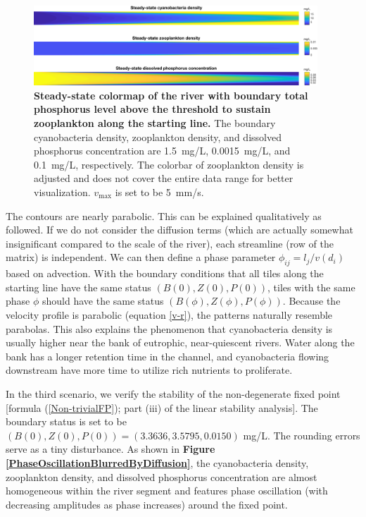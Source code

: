 \documentclass{article}
\begin{document}
\begin{figure}[H]
    \centering
    \includegraphics[width=0.95\textwidth]{ZooplanktonIncrease.pdf}
    \caption{\textbf{Steady-state colormap of the river with boundary total phosphorus level above the threshold to sustain zooplankton along the starting line.} The boundary cyanobacteria density, zooplankton density, and dissolved phosphorus concentration are \SI{1.5}{mg/L}, \SI{0.0015}{mg/L}, and \SI{0.1}{mg/L}, respectively. The colorbar of zooplankton density is adjusted and does not cover the entire data range for better visualization. $v_{\max}$ is set to be \SI{5}{mm/s}.}
    \label{ZIncrease}
\end{figure}

The contours are nearly parabolic. This can be explained qualitatively as followed. If we do not consider the diffusion terms (which are actually somewhat insignificant compared to the scale of the river), each streamline (row of the matrix) is independent. We can then define a phase parameter $\phi_{ij} = l_j / v(d_i)$ based on advection. With the boundary conditions that all tiles along the starting line have the same status $(B(0), Z(0), P(0))$, tiles with the same phase $\phi$ should have the same status $(B(\phi), Z(\phi), P(\phi))$. Because the velocity profile is parabolic (equation \ref{v-r}), the patterns naturally resemble parabolas. This also explains the phenomenon that cyanobacteria density is usually higher near the bank of eutrophic, near-quiescent rivers. Water along the bank has a longer retention time in the channel, and cyanobacteria flowing downstream have more time to utilize rich nutrients to proliferate.

In the third scenario, we verify the stability of the non-degenerate fixed point [formula (\ref{Non-trivialFP}); part (iii) of the linear stability analysis]. The boundary status is set to be $(B(0), Z(0), P(0)) = (3.3636, 3.5795, 0.0150)$ mg/L. The rounding errors serve as a tiny disturbance. As shown in \textbf{Figure \ref{PhaseOscillationBlurredByDiffusion}}, the cyanobacteria density, zooplankton density, and dissolved phosphorus concentration are almost homogeneous within the river segment and features phase oscillation (with decreasing amplitudes as phase increases) around the fixed point. 
\end{document}
